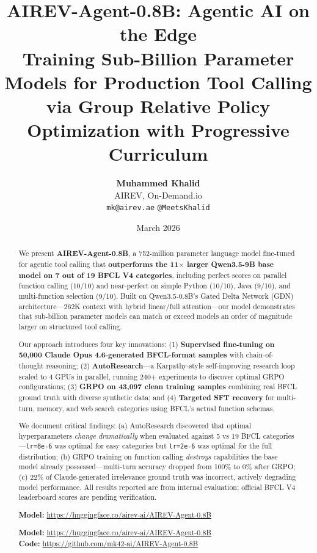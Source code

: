 \documentclass[10pt,twocolumn]{article}
\title{\textbf{AIREV-Agent-0.8B: Agentic AI on the Edge} \\[0.3em]
\large Training Sub-Billion Parameter Models for Production Tool Calling \\
via Group Relative Policy Optimization with Progressive Curriculum}
\author{
\textbf{Muhammed Khalid} \\[0.3em]
AIREV, On-Demand.io \\[0.2em]
\texttt{mk@airev.ae} \quad \texttt{@MeetsKhalid}
}
\date{March 2026}
\begin{document}
\maketitle

\begin{abstract}
We present \textbf{AIREV-Agent-0.8B}, a 752-million parameter language model fine-tuned for agentic tool calling that \textbf{outperforms the 11$\times$ larger Qwen3.5-9B base model on 7 out of 19 BFCL V4 categories}, including perfect scores on parallel function calling (10/10) and near-perfect on simple Python (10/10), Java (9/10), and multi-function selection (9/10). Built on Qwen3.5-0.8B's Gated Delta Network (GDN) architecture---262K context with hybrid linear/full attention---our model demonstrates that sub-billion parameter models can match or exceed models an order of magnitude larger on structured tool calling.

Our approach introduces four key innovations: (1) \textbf{Supervised fine-tuning on 50,000 Claude Opus 4.6-generated BFCL-format samples} with chain-of-thought reasoning; (2) \textbf{AutoResearch}---a Karpathy-style self-improving research loop scaled to 4 GPUs in parallel, running 240+ experiments to discover optimal GRPO configurations; (3) \textbf{GRPO on 43,097 clean training samples} combining real BFCL ground truth with diverse synthetic data; and (4) \textbf{Targeted SFT recovery} for multi-turn, memory, and web search categories using BFCL's actual function schemas.

We document critical findings: (a) AutoResearch discovered that optimal hyperparameters \textit{change dramatically} when evaluated against 5 vs 19 BFCL categories---\texttt{lr=8e-6} was optimal for easy categories but \texttt{lr=2e-6} was optimal for the full distribution; (b) GRPO training on function calling \textit{destroys} capabilities the base model already possessed---multi-turn accuracy dropped from 100\% to 0\% after GRPO; (c) 22\% of Claude-generated irrelevance ground truth was incorrect, actively degrading model performance. All results reported are from internal evaluation; official BFCL V4 leaderboard scores are pending verification.

\textbf{Model:} \url{https://huggingface.co/airev-ai/AIREV-Agent-0.8B}

\textbf{Model:} \url{https://huggingface.co/airev-ai/AIREV-Agent-0.8B} \\
\textbf{Code:} \url{https://github.com/mk42-ai/AIREV-Agent-0.8B}
\end{abstract}
\end{document}
